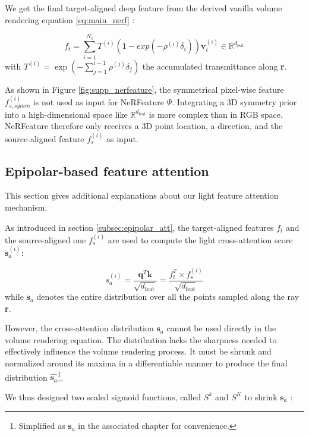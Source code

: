 We get the final target-aligned deep feature from the derived vanilla volume rendering equation \eqref{eq:main_nerf} :

\begin{equation}
\label{eq:ft_vr}
    f_{t} = \sum_{i=1}^{N_{s}} T^{(i)}(1-exp(-\rho^{(i)}\delta_{i}))\mathbf{v}_{t}^{(i)} \in \mathbb{R}^{d_{\text{feat}}}
\end{equation}
with $T^{(i)} = \exp\left(-\sum_{j=1}^{i-1}\rho^{(j)}\delta_{j}\right)$ the accumulated transmittance along \textbf{r}.

As shown in Figure \ref{fig:supp_nerfeature}, the symmetrical pixel-wise feature $f_{s,symm}^{(i)}$ is not used as input for NeRFeature $\Psi$. Integrating a 3D symmetry prior into a high-dimensional space like $\mathbb{R}^{d_{\text{feat}}}$ is more complex than in RGB space. NeRFeature therefore only receives a 3D point location, a direction, and the source-aligned feature $f_{s}^{(i)}$ as input.

\subsection{Epipolar-based feature attention}
\label{appendix:epinerf-feature}
This section gives additional explanations about our light feature attention mechanism.

As introduced in section \ref{subsec:epipolar_att}, the target-aligned features $f_{t}$ and the source-aligned one $f_{s}^{(i)}$ are used to compute the light cross-attention score $\mathbf{s}_{a}^{(i)}$:

\begin{equation}
    s_{a}^{(i)} = \frac{\mathbf{q}^{T}\mathbf{k}}{\sqrt{d_{\text{feat}}}}= \frac{f_{t}^{T}\times f_{s}^{(i)}}{\sqrt{d_{\text{feat}}}}
\label{eq:attention}
\end{equation}
while $\mathbf{s}_{a}$ denotes the entire distribution over all the points sampled along the ray \textbf{r}.

However, the cross-attention distribution $\mathbf{s}_{a}$ cannot be used directly in the volume rendering equation. The distribution lacks the sharpness needed to effectively influence the volume rendering process. It must be shrunk and normalized around its maxima in a differentiable manner to produce the final distribution $\hat{\mathbf{s}_{a}}$\footnote{Simplified as $\mathbf{s}_{a}$ in the associated chapter for convenience.}.

We thus designed two scaled sigmoid functions, called $S^{k}$ and $S^{K}$ to shrink $\mathbf{s}_{a}$ : 

